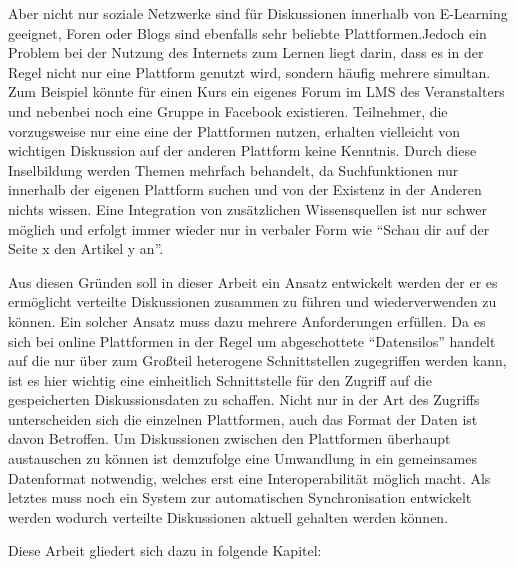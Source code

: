 \medskip
Aber nicht nur soziale Netzwerke sind für Diskussionen innerhalb von E-Learning geeignet, Foren oder Blogs sind ebenfalls sehr beliebte Plattformen.Jedoch ein Problem bei der Nutzung des Internets zum Lernen liegt darin, dass es in der Regel nicht nur eine Plattform genutzt wird, sondern häufig mehrere simultan. Zum Beispiel könnte für einen Kurs ein eigenes Forum im LMS des Veranstalters und nebenbei noch eine Gruppe in Facebook existieren. Teilnehmer, die vorzugsweise nur eine eine der Plattformen nutzen, erhalten vielleicht von wichtigen Diskussion auf der anderen Plattform keine Kenntnis. Durch diese Inselbildung werden Themen mehrfach behandelt, da Suchfunktionen nur innerhalb der eigenen Plattform suchen und von der Existenz in der Anderen nichts wissen. Eine Integration von zusätzlichen Wissensquellen ist nur schwer möglich und erfolgt immer wieder nur in verbaler Form wie \enquote{Schau dir auf der Seite x den Artikel y an}.

\medskip

Aus diesen Gründen soll in dieser Arbeit ein Ansatz entwickelt werden der er es ermöglicht verteilte Diskussionen zusammen zu führen und wiederverwenden zu können. Ein solcher Ansatz muss dazu mehrere Anforderungen erfüllen. Da es sich bei online Plattformen in der Regel um abgeschottete \enquote{Datensilos}\cite{Berners-Lee2011} handelt auf die nur über zum Großteil heterogene Schnittstellen zugegriffen werden kann, ist es hier wichtig eine einheitlich Schnittstelle für den Zugriff auf die gespeicherten Diskussionsdaten zu schaffen. Nicht nur in der Art des Zugriffs unterscheiden sich die einzelnen Plattformen, auch das Format der Daten ist davon Betroffen. Um Diskussionen zwischen den Plattformen überhaupt austauschen zu können ist demzufolge eine Umwandlung in ein gemeinsames Datenformat notwendig, welches erst eine Interoperabilität möglich macht. Als letztes muss noch ein System zur automatischen Synchronisation entwickelt werden wodurch verteilte Diskussionen aktuell gehalten werden können.

\medskip

Diese Arbeit gliedert sich dazu in folgende Kapitel:


